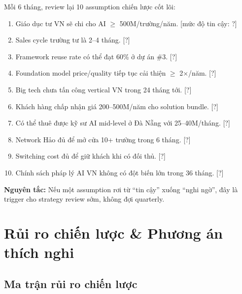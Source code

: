 \documentclass[11pt,a4paper]{article}
\begin{document}
Mỗi 6 tháng, review lại 10 assumption chiến lược cốt lõi:

\begin{enumerate}
\item Giáo dục tư VN sẽ chi cho AI $\geq$ 500M/trường/năm. [mức độ tin cậy: ?]
\item Sales cycle trường tư là 2--4 tháng. [?]
\item Framework reuse rate có thể đạt 60\% ở dự án \#3. [?]
\item Foundation model price/quality tiếp tục cải thiện $\geq$ 2$\times$/năm. [?]
\item Big tech chưa tấn công vertical VN trong 24 tháng tới. [?]
\item Khách hàng chấp nhận giá 200--500M/năm cho solution bundle. [?]
\item Có thể thuê được kỹ sư AI mid-level ở Đà Nẵng với 25--40M/tháng. [?]
\item Network Hảo đủ để mở cửa 10+ trường trong 6 tháng. [?]
\item Switching cost đủ để giữ khách khi có đối thủ. [?]
\item Chính sách pháp lý AI VN không có đột biến lớn trong 36 tháng. [?]
\end{enumerate}

\textbf{Nguyên tắc:} Nếu một assumption rơi từ ``tin cậy'' xuống ``nghi ngờ'', đây
là trigger cho strategy review sớm, không đợi quarterly.

\clearpage

\section{Rủi ro chiến lược \& Phương án thích nghi}

\subsection{Ma trận rủi ro chiến lược}
\end{document}
